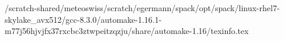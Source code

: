 /scratch-shared/meteoswiss/scratch/egermann/spack/opt/spack/linux-rhel7-skylake_avx512/gcc-8.3.0/automake-1.16.1-m77j56hjvjfx37rxcbc3ztwpeitzqzju/share/automake-1.16/texinfo.tex